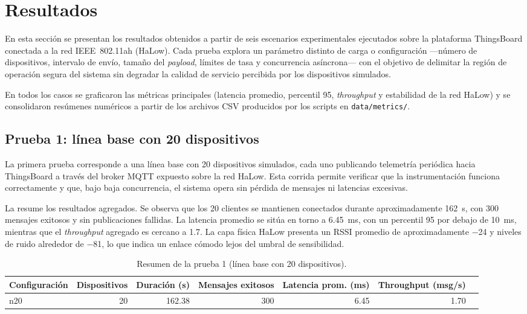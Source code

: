 \section{Resultados}
En esta secci\'on se presentan los resultados obtenidos a partir de seis escenarios experimentales ejecutados sobre la plataforma ThingsBoard conectada a la red IEEE~802.11ah (HaLow). Cada prueba explora un par\'ametro distinto de carga o configuraci\'on ---n\'umero de dispositivos, intervalo de env\'io, tama\~no del \emph{payload}, l\'imites de tasa y concurrencia as\'incrona--- con el objetivo de delimitar la regi\'on de operaci\'on segura del sistema sin degradar la calidad de servicio percibida por los dispositivos simulados.

En todos los casos se graficaron las m\'etricas principales (latencia promedio, percentil 95, \emph{throughput} y estabilidad de la red HaLow) y se consolidaron res\'umenes num\'ericos a partir de los archivos CSV producidos por los scripts en \texttt{data/metrics/}.

\subsection{Prueba 1: l\'inea base con 20 dispositivos}
La primera prueba corresponde a una l\'inea base con \num{20} dispositivos simulados, cada uno publicando telemetr\'ia peri\'odica hacia ThingsBoard a trav\'es del broker MQTT expuesto sobre la red HaLow. Esta corrida permite verificar que la instrumentaci\'on funciona correctamente y que, bajo baja concurrencia, el sistema opera sin p\'erdida de mensajes ni latencias excesivas.

La  resume los resultados agregados. Se observa que los \num{20} clientes se mantienen conectados durante aproximadamente \num{162}~\si{\second}, con \num{300} mensajes exitosos y sin publicaciones fallidas. La latencia promedio se sit\'ua en torno a \SI{6.45}{\milli\second}, con un percentil 95 por debajo de \SI{10}{\milli\second}, mientras que el \emph{throughput} agregado es cercano a \SI{1.7}{}. La capa f\'isica HaLow presenta un RSSI promedio de aproximadamente \SI{-24}{\decibelm} y niveles de ruido alrededor de \SI{-81}{\decibelm}, lo que indica un enlace c\'omodo lejos del umbral de sensibilidad.

\begin{table}[!t]
\centering
\caption{Resumen de la prueba 1 (l\'inea base con 20 dispositivos).}
\label{tab:prueba1}
\begin{tabular}{@{}lrrrrrr@{}}
\toprule
Configuraci\'on & Dispositivos & Duraci\'on (s) & Mensajes exitosos & Latencia prom. (ms) & Throughput (msg/s) \\
\midrule
n20 & 20 & 162.38 & 300 & 6.45 & 1.70 \\
\bottomrule
\end{tabular}
\end{table}

